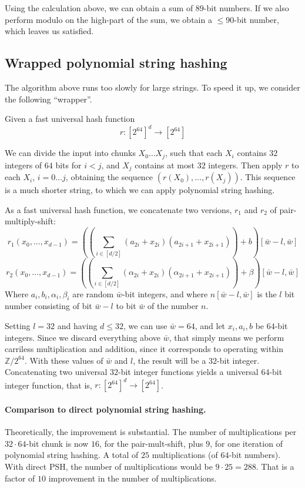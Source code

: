 \documentclass[]{article}
\begin{document}
Using the calculation above, we can obtain a sum of $89$-bit numbers. If we also perform modulo on the high-part of the sum, we obtain a $\le 90$-bit number, which leaves us satisfied.

\subsection*{Wrapped polynomial string hashing}

The algorithm above runs too slowly for large strings. To speed it up, we consider the following ``wrapper''.

Given a fast universal hash function
\[r : [2^{64}]^d \to [2^{64}] \]

We can divide the input into chunks $X_0 \ldots X_j$, such that each $X_i$ contains $32$ integers of $64$ bits for $i<j$, and $X_j$ contains at most $32$ integers. Then apply $r$ to each $X_i$, $i=0\ldots j$, obtaining the sequence $\left(r(X_0), \ldots , r(X_j)\right)$. This sequence is a much shorter string, to which we can apply polynomial string hashing.

As a fast universal hash function, we concatenate two versions, $r_1$ and $r_2$ of pair-multiply-shift:
\[r_1(x_0,\ldots ,x_{d-1}) = \left(\left(\sum_{i\in [d/2]}(a_{2i} + x_{2i})(a_{2i+1} + x_{2i+1}) \right)+b \right) [\bar{w}-l,\bar{w}]\]
\[r_2(x_0,\ldots ,x_{d-1}) = \left(\left(\sum_{i\in [d/2]}(\alpha_{2i} + x_{2i})(\alpha_{2i+1} + x_{2i+1}) \right)+\beta \right) [\bar{w}-l,\bar{w}]\]
Where $a_i,b_i,\alpha_i,\beta_i$ are random $\bar{w}$-bit integers, and where $n[\bar{w}-l,\bar{w}]$ is the $l$ bit number consisting of bit $\bar{w}-l$ to bit $\bar{w}$ of the number $n$.

Setting $l = 32$ and having $d\leq 32$, we can use $\bar{w} = 64$, and let $x_i,a_i,b$ be $64$-bit integers. Since we discard everything above $\bar{w}$, that simply means we perform carriless multiplication and addition, since it corresponds to operating within $\mathbb{Z}/2^{64}$. With these values of $\bar{w}$ and $l$, the result will be a $32$-bit integer. Concatenating two universal $32$-bit integer functions yields a universal $64$-bit integer function, that is, $r: [2^{64}]^d \to [2^{64}]$.

\paragraph{Comparison to direct polynomial string hashing.} Theoretically, the improvement is substantial. The number of multiplications per $32\cdot 64$-bit chunk is now $16$, for the pair-mult-shift, plus $9$, for one iteration of polynomial string hashing. A total of $25$ multiplications (of $64$-bit numbers). With direct PSH, the number of multiplications would be $9\cdot 25 = 288$. That is a factor of $10$ improvement in the number of multiplications.
\end{document}
